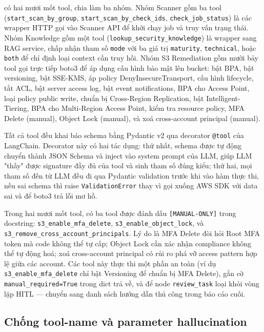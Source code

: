 \sysnameshort{} có hai mươi mốt tool, chia làm ba nhóm. Nhóm Scanner gồm ba tool (\texttt{start\_scan\_by\_group}, \texttt{start\_scan\_by\_check\_ids}, \texttt{check\_job\_status}) là các wrapper HTTP gọi vào Scanner API để khởi chạy job và truy vấn trạng thái. Nhóm Knowledge gồm một tool (\texttt{lookup\_security\_knowledge}) là wrapper sang RAG service, chấp nhận tham số \texttt{mode} với ba giá trị \texttt{maturity}, \texttt{technical}, hoặc \texttt{both} để chỉ định loại context cần truy hồi. Nhóm S3 Remediation gồm mười bảy tool gọi trực tiếp boto3 để áp dụng cấu hình bảo mật lên bucket: bật BPA, bật versioning, bật SSE-KMS, áp policy DenyInsecureTransport, cấu hình lifecycle, tắt ACL, bật server access log, bật event notifications, BPA cho Access Point, loại policy public write, chuẩn bị Cross-Region Replication, bật Intelligent-Tiering, BPA cho Multi-Region Access Point, kiểm tra resource policy, MFA Delete (manual), Object Lock (manual), và xoá cross-account principal (manual).

Tất cả tool đều khai báo schema bằng Pydantic v2 qua decorator \texttt{@tool} của LangChain. Decorator này có hai tác dụng: thứ nhất, schema được tự động chuyển thành JSON Schema và inject vào system prompt của LLM, giúp LLM "thấy" được signature đầy đủ của tool và sinh tham số đúng kiểu; thứ hai, mọi tham số đến từ LLM đều đi qua Pydantic validation trước khi vào hàm thực thi, nếu sai schema thì raise \texttt{ValidationError} thay vì gọi xuống AWS SDK với data sai và để boto3 trả lỗi mơ hồ.

Trong hai mươi mốt tool, có ba tool được đánh dấu \texttt{[MANUAL-ONLY]} trong docstring: \texttt{s3\_enable\_mfa\_delete}, \texttt{s3\_enable\_object\_lock}, và \texttt{s3\_remove\_cross\_account\_principals}. Lý do là MFA Delete đòi hỏi Root MFA token mà code không thể tự cấp; Object Lock cần xác nhận compliance không thể tự động hoá; xoá cross-account principal có rủi ro phá vỡ access pattern hợp lệ giữa các account. Các tool này thực thi một phần an toàn (ví dụ \texttt{s3\_enable\_mfa\_delete} chỉ bật Versioning để chuẩn bị MFA Delete), gắn cờ \texttt{manual\_required=True} trong dict trả về, và để node \texttt{review\_task} loại khỏi vòng lặp HITL — chuyển sang danh sách hướng dẫn thủ công trong báo cáo cuối.

\subsection{Chống tool-name và parameter hallucination}

